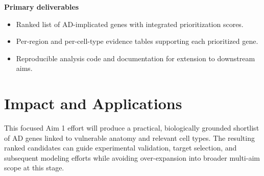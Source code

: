 \documentclass{article}
\begin{document}
\textbf{Primary deliverables}
\begin{itemize}
\item Ranked list of AD-implicated genes with integrated prioritization scores.
\item Per-region and per-cell-type evidence tables supporting each prioritized gene.
\item Reproducible analysis code and documentation for extension to downstream aims.
\end{itemize}

\section{Impact and Applications}
This focused Aim 1 effort will produce a practical, biologically grounded shortlist of AD genes linked to vulnerable anatomy and relevant cell types. The resulting ranked candidates can guide experimental validation, target selection, and subsequent modeling efforts while avoiding over-expansion into broader multi-aim scope at this stage.



\end{document}
